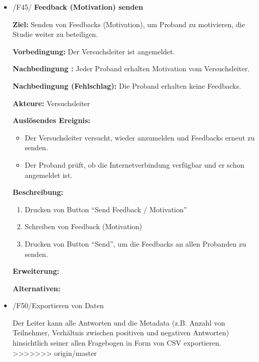 \documentclass[a4paper]{scrreprt}
\begin{document}
\begin{itemize}
                \item /F45/ \textbf{Feedback (Motivation) senden}
                    \par \textbf{Ziel: }Senden von Feedbacks (Motivation), um Proband zu motivieren, die Studie weiter zu beteiligen.
                    \par \textbf{Vorbedingung: }Der Versuchsleiter ist angemeldet.
                    \par \textbf{Nachbedingung : }Jeder Proband erhalten Motivation vom Versuchsleiter.
                    \par \textbf{Nachbedingung (Fehlschlag): }Die Proband erhalten keine Feedbacks.
                    \par \textbf{Akteure: }Versuchsleiter
                    \par \textbf{Auslösendes Ereignis: }
                        \begin{itemize}
                            \item Der Versuchsleiter versucht, wieder anzumelden und Feedbacks erneut zu senden.
                            \item Der Proband pr\"uft, ob die Internetverbindung verf\"ugbar und er schon angemeldet ist.
                        \end{itemize}
                    \par \textbf{Beschreibung: }
                        \begin{enumerate}
                            \item Drucken von Button ``Send Feedback / Motivation''
                            \item Schreiben von Feedback (Motivation)
                            \item Drucken von Button ``Send'', um die Feedbacks an allen Probanden zu senden.
                        \end{enumerate}
                    \par \textbf{Erweiterung: }
                    \par \textbf{Alternativen: }



	            \item /F50/Exportieren von Daten
		         	\par Der Leiter kann alle Antworten und die Metadata (z.B. Anzahl von Teilnehmer, Verhältnis zwischen positiven und negativen Antworten) hinsichtlich seiner allen Fragebogen in Form von CSV exportieren.
>>>>>>> origin/master

			\end{itemize}
\end{document}
